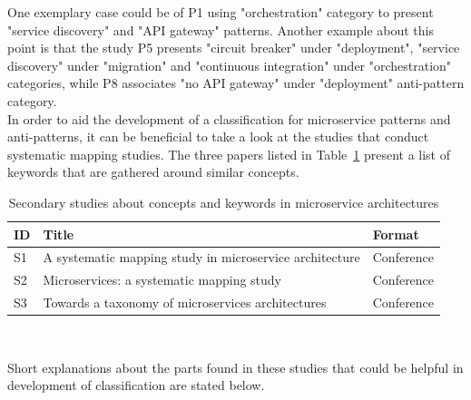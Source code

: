 \documentclass{Configuration_Files/PoliMi3i_thesis}
\begin{document}
One exemplary case could be of P1 using "orchestration" category to present "service discovery" and "API gateway" patterns.
Another example about this point is that the study P5 presents "circuit breaker" under "deployment", "service discovery" under "migration" and "continuous integration" under "orchestration" categories, while P8 associates "no API gateway" under "deployment" anti-pattern category.
\\
In order to aid the development of a classification for microservice patterns and anti-patterns, it can be beneficial to take a look at the studies that conduct systematic mapping studies.
The three papers listed in Table~\ref{table:secondary_studies} present a list of keywords that are gathered around similar concepts.

\begin{table}[H]
\centering 
    \begin{tabular}{|l p{30em} l|}
    \hline
    \rowcolor{bluepoli!40}
    \textbf{ID} & \textbf{Title} & \textbf{Format}\T\B \\
    \hline \hline
    S1 & A systematic mapping study in microservice architecture \cite{7796008} & Conference\T\B\\
    \hline
    \rowcolor{bluepoli!10}
    S2 & Microservices: a systematic mapping study \cite{10.5220/0005785501370146} & Conference\T\B\\
    \hline
    S3 & Towards a taxonomy of microservices architectures \cite{10.1007/978-3-319-74781-1_15} & Conference\T\B\\
    \hline
    \end{tabular}
    \\[10pt]
    \caption{Secondary studies about concepts and keywords in microservice architectures}
    \label{table:secondary_studies}
\end{table}

Short explanations about the parts found in these studies that could be helpful in development of classification are stated below.
\end{document}
